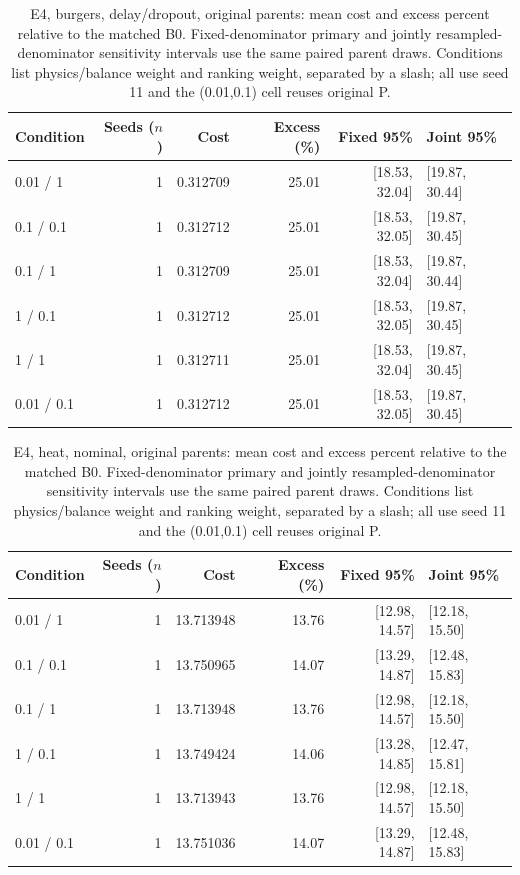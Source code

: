 \begin{table}[ht]
\centering\small
\caption{E4, burgers, delay/dropout, original parents: mean cost and excess percent relative to the matched B0. Fixed-denominator primary and jointly resampled-denominator sensitivity intervals use the same paired parent draws. Conditions list physics/balance weight and ranking weight, separated by a slash; all use seed 11 and the (0.01,0.1) cell reuses original P.}\label{tab:revision_cost_E4_burgers_locked_delay_dropout}
\begin{tabular}{@{}lrrrrl@{}}\toprule
Condition & Seeds ($n$) & Cost & Excess (\%) & Fixed 95\% & Joint 95\%\\\midrule
0.01 / 1 & 1 & 0.312709 & 25.01 & [18.53, 32.04] & [19.87, 30.44]\\
0.1 / 0.1 & 1 & 0.312712 & 25.01 & [18.53, 32.05] & [19.87, 30.45]\\
0.1 / 1 & 1 & 0.312709 & 25.01 & [18.53, 32.04] & [19.87, 30.44]\\
1 / 0.1 & 1 & 0.312712 & 25.01 & [18.53, 32.05] & [19.87, 30.45]\\
1 / 1 & 1 & 0.312711 & 25.01 & [18.53, 32.04] & [19.87, 30.45]\\
0.01 / 0.1 & 1 & 0.312712 & 25.01 & [18.53, 32.05] & [19.87, 30.45]\\
\bottomrule\end{tabular}
\end{table}

\begin{table}[ht]
\centering\small
\caption{E4, heat, nominal, original parents: mean cost and excess percent relative to the matched B0. Fixed-denominator primary and jointly resampled-denominator sensitivity intervals use the same paired parent draws. Conditions list physics/balance weight and ranking weight, separated by a slash; all use seed 11 and the (0.01,0.1) cell reuses original P.}\label{tab:revision_cost_E4_heat_locked_nominal}
\begin{tabular}{@{}lrrrrl@{}}\toprule
Condition & Seeds ($n$) & Cost & Excess (\%) & Fixed 95\% & Joint 95\%\\\midrule
0.01 / 1 & 1 & 13.713948 & 13.76 & [12.98, 14.57] & [12.18, 15.50]\\
0.1 / 0.1 & 1 & 13.750965 & 14.07 & [13.29, 14.87] & [12.48, 15.83]\\
0.1 / 1 & 1 & 13.713948 & 13.76 & [12.98, 14.57] & [12.18, 15.50]\\
1 / 0.1 & 1 & 13.749424 & 14.06 & [13.28, 14.85] & [12.47, 15.81]\\
1 / 1 & 1 & 13.713943 & 13.76 & [12.98, 14.57] & [12.18, 15.50]\\
0.01 / 0.1 & 1 & 13.751036 & 14.07 & [13.29, 14.87] & [12.48, 15.83]\\
\bottomrule\end{tabular}
\end{table}

